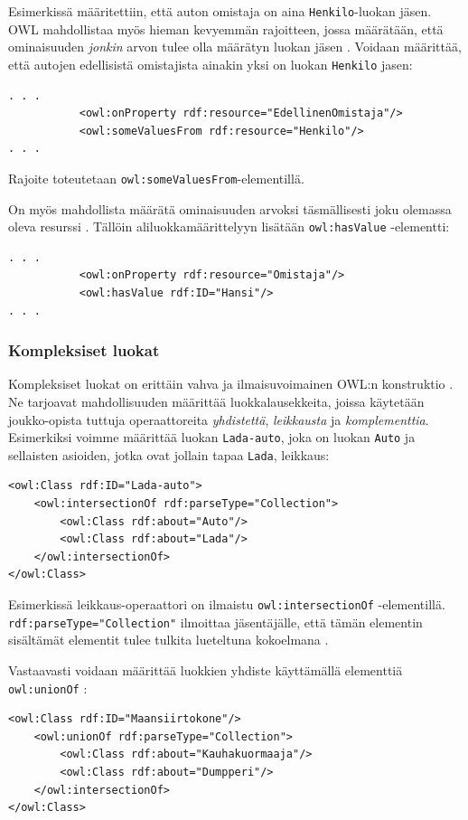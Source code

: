 \documentclass[finnish]{tktltiki2}
\theoremstyle{definition}
\theoremstyle{remark}
\begin{document}
Esimerkissä määritettiin, että auton omistaja on aina \texttt{Henkilo}-luokan jäsen. OWL mahdollistaa myös hieman kevyemmän rajoitteen, jossa määrätään, että ominaisuuden \textit{jonkin} arvon tulee olla määrätyn luokan jäsen \cite{SWM04}. Voidaan määrittää, että autojen edellisistä omistajista ainakin yksi on luokan \texttt{Henkilo} jasen:
\begin{verbatim}
. . .
           <owl:onProperty rdf:resource="EdellinenOmistaja"/>
           <owl:someValuesFrom rdf:resource="Henkilo"/>
. . .

\end{verbatim}
Rajoite toteutetaan \texttt{owl:someValuesFrom}-elementillä.

On myös mahdollista määrätä ominaisuuden arvoksi täsmällisesti joku olemassa oleva resurssi \cite{SWM04}. Tällöin aliluokkamäärittelyyn lisätään \texttt{owl:hasValue} -elementti:
\begin{verbatim}
. . .
           <owl:onProperty rdf:resource="Omistaja"/>
           <owl:hasValue rdf:ID="Hansi"/>
. . .
\end{verbatim}

\subsubsection{Kompleksiset luokat}
Kompleksiset luokat on erittäin vahva ja ilmaisuvoimainen OWL:n konstruktio \cite{SWM04}. Ne tarjoavat mahdollisuuden määrittää luokkalausekkeita, joissa käytetään joukko-opista tuttuja operaattoreita \textit{yhdistettä}, \textit{leikkausta} ja \textit{komplementtia}. Esimerkiksi voimme määrittää luokan \texttt{Lada-auto}, joka on luokan \texttt{Auto} ja sellaisten asioiden, jotka ovat jollain tapaa \texttt{Lada}, leikkaus:
\begin{verbatim}
<owl:Class rdf:ID="Lada-auto">
    <owl:intersectionOf rdf:parseType="Collection">
        <owl:Class rdf:about="Auto"/>
        <owl:Class rdf:about="Lada"/>
    </owl:intersectionOf>
</owl:Class>
\end{verbatim}

Esimerkissä leikkaus-operaattori on ilmaistu \texttt{owl:intersectionOf} -elementillä. \texttt{rdf:parseType="Collection"} ilmoittaa jäsentäjälle, että tämän elementin sisältämät elementit tulee tulkita lueteltuna kokoelmana \cite{SWM04}.

Vastaavasti voidaan määrittää luokkien yhdiste käyttämällä elementtiä \texttt{owl:unionOf} \cite{SWM04}:
\begin{verbatim}
<owl:Class rdf:ID="Maansiirtokone"/>
    <owl:unionOf rdf:parseType="Collection">
        <owl:Class rdf:about="Kauhakuormaaja"/>
        <owl:Class rdf:about="Dumpperi"/>
    </owl:intersectionOf>
</owl:Class>
\end{verbatim}
 
\end{document}
